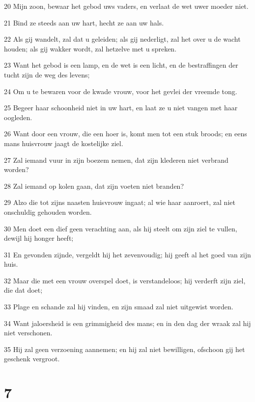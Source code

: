 \par 20 Mijn zoon, bewaar het gebod uws vaders, en verlaat de wet uwer moeder niet.
\par 21 Bind ze steeds aan uw hart, hecht ze aan uw hals.
\par 22 Als gij wandelt, zal dat u geleiden; als gij nederligt, zal het over u de wacht houden; als gij wakker wordt, zal hetzelve met u spreken.
\par 23 Want het gebod is een lamp, en de wet is een licht, en de bestraffingen der tucht zijn de weg des levens;
\par 24 Om u te bewaren voor de kwade vrouw, voor het gevlei der vreemde tong.
\par 25 Begeer haar schoonheid niet in uw hart, en laat ze u niet vangen met haar oogleden.
\par 26 Want door een vrouw, die een hoer is, komt men tot een stuk broods; en eens mans huisvrouw jaagt de kostelijke ziel.
\par 27 Zal iemand vuur in zijn boezem nemen, dat zijn klederen niet verbrand worden?
\par 28 Zal iemand op kolen gaan, dat zijn voeten niet branden?
\par 29 Alzo die tot zijns naasten huisvrouw ingaat; al wie haar aanroert, zal niet onschuldig gehouden worden.
\par 30 Men doet een dief geen verachting aan, als hij steelt om zijn ziel te vullen, dewijl hij honger heeft;
\par 31 En gevonden zijnde, vergeldt hij het zevenvoudig; hij geeft al het goed van zijn huis.
\par 32 Maar die met een vrouw overspel doet, is verstandeloos; hij verderft zijn ziel, die dat doet;
\par 33 Plage en schande zal hij vinden, en zijn smaad zal niet uitgewist worden.
\par 34 Want jaloersheid is een grimmigheid des mans; en in den dag der wraak zal hij niet verschonen.
\par 35 Hij zal geen verzoening aannemen; en hij zal niet bewilligen, ofschoon gij het geschenk vergroot.

\chapter{7}

